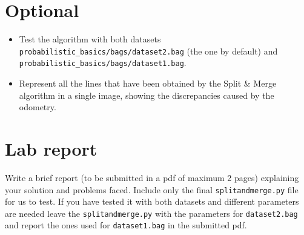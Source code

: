 \documentclass[a4paper,10pt]{article}
\begin{document}
\section{Optional}
\begin{itemize}
    \item Test the algorithm with both datasets \texttt{probabilistic\_basics/bags/dataset2.bag} (the one by default) and \texttt{probabilistic\_basics/bags/dataset1.bag}.
    \item Represent all the lines that have been obtained by the Split \& Merge algorithm in a single image, showing the discrepancies caused by the odometry.
\end{itemize}

\section{Lab report}

Write a brief report (to be submitted in a pdf of maximum 2 pages) explaining your solution and problems faced. Include only the final \texttt{splitandmerge.py} file for us to test. If you have tested it with both datasets and different parameters are needed leave the \texttt{splitandmerge.py} with the parameters for \texttt{dataset2.bag} and report the ones used for \texttt{dataset1.bag} in the submitted pdf.
\end{document}
